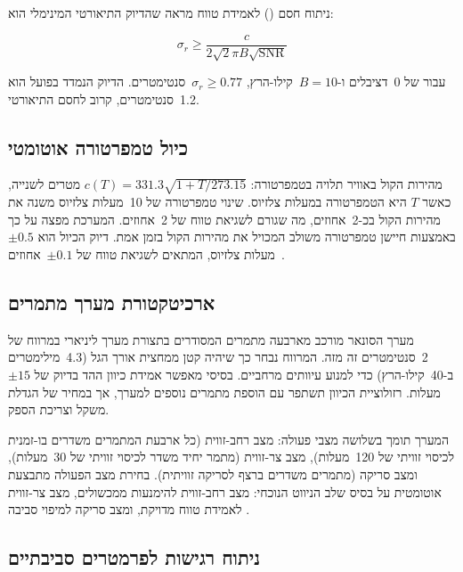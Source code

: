 ניתוח חסם  () לאמידת טווח מראה שהדיוק התיאורטי המינימלי הוא:

\begin{equation}
\sigma_r \geq \frac{c}{2 \sqrt{2} \pi B \sqrt{\text{SNR}}}
\label{eq:ch03_crlb_range}
\end{equation}

עבור  של 0~דציבלים ו-$B = 10$~קילו-הרץ, $\sigma_r \geq 0.77$~סנטימטרים. הדיוק הנמדד בפועל הוא 1.2~סנטימטרים, קרוב לחסם התיאורטי.

\subsection{כיול טמפרטורה אוטומטי}
\label{sec:temperature_calibration}

מהירות הקול באוויר תלויה בטמפרטורה: $c(T) = 331.3 \sqrt{1 + T/273.15}$ מטרים לשנייה, כאשר $T$ היא הטמפרטורה במעלות צלזיוס. שינוי טמפרטורה של 10~מעלות צלזיוס משנה את מהירות הקול בכ-2~אחוזים, מה שגורם לשגיאת טווח של 2~אחוזים. המערכת מפצה על כך באמצעות חיישן טמפרטורה משולב המכויל את מהירות הקול בזמן אמת. דיוק הכיול הוא $\pm0.5$~מעלות צלזיוס, המתאים לשגיאת טווח של $\pm0.1$~אחוזים.

\subsection{ארכיטקטורת מערך מתמרים}
\label{sec:transducer_array}

מערך הסונאר מורכב מארבעה מתמרים המסודרים בתצורת מערך ליניארי במרווח של 2~סנטימטרים זה מזה. המרווח נבחר כך שיהיה קטן ממחצית אורך הגל (4.3~מילימטרים ב-40~קילו-הרץ) כדי למנוע עיוותים מרחביים.  בסיסי מאפשר אמידת כיוון ההד בדיוק של $\pm15$~מעלות. רזולוציית הכיוון תשתפר עם הוספת מתמרים נוספים למערך, אך במחיר של הגדלת משקל וצריכת הספק.

המערך תומך בשלושה מצבי פעולה: מצב רחב-זווית (כל ארבעת המתמרים משדרים בו-זמנית לכיסוי זוויתי של 120~מעלות), מצב צר-זווית (מתמר יחיד משדר לכיסוי זוויתי של 30~מעלות), ומצב סריקה (מתמרים משדרים ברצף לסריקה זוויתית). בחירת מצב הפעולה מתבצעת אוטומטית על בסיס שלב הניווט הנוכחי: מצב רחב-זווית להימנעות ממכשולים, מצב צר-זווית לאמידת טווח מדויקת, ומצב סריקה למיפוי סביבה \cite{Chen2020BioSonar, Horiuchi2005Neuromorphic}.

\subsection{ניתוח רגישות לפרמטרים סביבתיים}
\label{sec:environmental_sensitivity}

